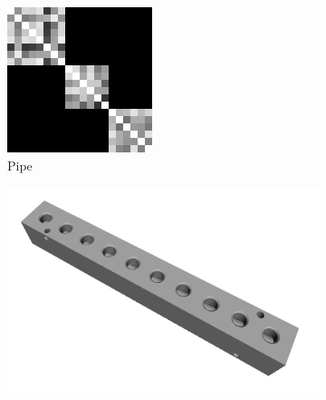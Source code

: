 \begin{figure}[ht]
\begin{subfigure}[b]{0.20\linewidth}
		\includegraphics[width=\linewidth]{fig/3dreg/reg3Dtrain_pipe.png} 
		\caption{Pipe}
	\end{subfigure}
	\begin{subfigure}[b]{0.20\linewidth}
		\includegraphics[width=\linewidth]{fig/3dreg/block.png} \\

\end{subfigure}
\end{figure}
